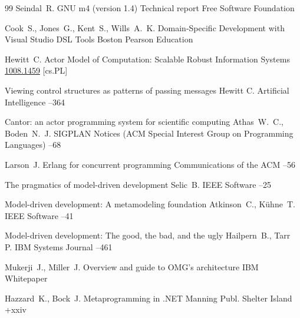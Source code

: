 \begin{thebibliography}{99}
\by Seindal~R.
\preprint GNU m4 (version 1.4)
\preprintinfo Technical report
\publ Free Software Foundation 

\by Cook~S., Jones~G., Kent~S., Wills~A.~K. 
\book Domain-Specific Development with Visual Studio DSL Tools
\publaddr Boston
\publ Pearson Education


\by Hewitt~C. 
\eprint Actor Model of Computation: Scalable Robust Information Systems
\arxiv \href{http://arxiv.org/abs/1008.1459}{1008.1459} [cs.PL]

\paper Viewing control structures as patterns of passing messages  
\by Hewitt C.  
\jour Artificial Intelligence
--364


\paper Cantor: an actor programming system for scientific computing  
\by Athas~W.~C., Boden~N.~J.
\jour SIGPLAN Notices (ACM Special Interest Group on Programming Languages)
--68


\by Larson~J.
\paper Erlang for concurrent programming 
\jour Communications of the ACM
--56



\paper The pragmatics of model-driven development  
\by Selic~B.
\jour IEEE Software
--25


\paper Model-driven development: A metamodeling foundation  
\by Atkinson~C., K\"uhne~T.
\jour IEEE Software
--41


\paper Model-driven development: The good, the bad, and the ugly  
\by Hailpern~B., Tarr~ P.
\jour IBM Systems Journal
--461




\by Mukerji~J., Miller~J.
\preprint Overview and guide to OMG's architecture 
\preprintinfo IBM Whitepaper


\by Hazzard~K., Bock~J.
\book Metaprogramming in .NET
\publ Manning Publ.
\publaddr Shelter Island
+xxiv

\end{thebibliography}

